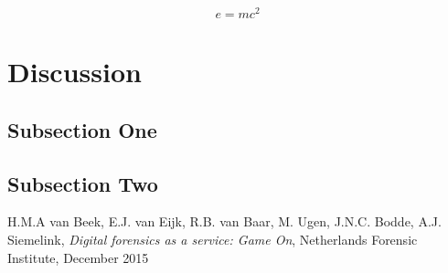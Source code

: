 \documentclass[twoside]{article}
\begin{document}
\begin{multicols}{2}
\lipsum[5] %

\begin{equation}
\label{eq:emc}
e = mc^2
\end{equation}

\lipsum[6] %


\section{Discussion}

\subsection{Subsection One}

\lipsum[7] %

\subsection{Subsection Two}

\lipsum[8] %


\begin{thebibliography}{99} %

    H.M.A van Beek, E.J. van Eijk, R.B. van Baar, M. Ugen, J.N.C. Bodde, A.J. Siemelink,
    \emph{Digital forensics as a service: Game On},
    Netherlands Forensic Institute,
    December 2015

\end{thebibliography}


\end{multicols}
\end{document}
